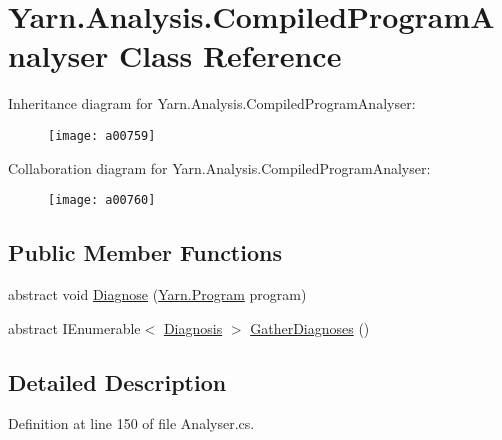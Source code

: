 \hypertarget{a00047}{\section{Yarn.\-Analysis.\-Compiled\-Program\-Analyser Class Reference}
\label{a00047}
}


Inheritance diagram for Yarn.\-Analysis.\-Compiled\-Program\-Analyser\-:
\nopagebreak
\begin{figure}[H]
\begin{center}
\leavevmode
\texttt{[image: a00759]}
\end{center}
\end{figure}


Collaboration diagram for Yarn.\-Analysis.\-Compiled\-Program\-Analyser\-:
\nopagebreak
\begin{figure}[H]
\begin{center}
\leavevmode
\texttt{[image: a00760]}
\end{center}
\end{figure}
\subsection*{Public Member Functions}
\begin{DoxyCompactItemize}
\item 
abstract void \hyperlink{a00047_aba4a36cb823b11ee491074e26477d084}{Diagnose} (\hyperlink{a00146}{Yarn.\-Program} program)
\item 
abstract I\-Enumerable$<$ \hyperlink{a00085}{Diagnosis} $>$ \hyperlink{a00047_afe059a2ceeabe50380b000420e512bd6}{Gather\-Diagnoses} ()
\end{DoxyCompactItemize}


\subsection{Detailed Description}


Definition at line 150 of file Analyser.\-cs.



